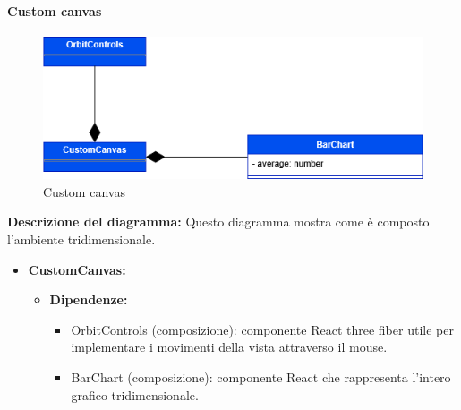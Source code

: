 \paragraph{Custom canvas}
\begin{figure}[h!] \centering
    \includegraphics[scale=0.45]{template/images/uml_front/ui/customcanvas.png}
    \caption{Custom canvas}
\end{figure}
\textbf{Descrizione del diagramma:}
Questo diagramma mostra come è composto l'ambiente tridimensionale.
\begin{itemize}
    \item \textbf{CustomCanvas:}
    \begin{itemize}
        \item \textbf{Dipendenze:}
        \begin{itemize}
            \item OrbitControls (composizione): componente React three fiber utile per implementare i movimenti della vista attraverso il mouse.
            \item BarChart (composizione): componente React che rappresenta l'intero grafico tridimensionale.
        \end{itemize} 
    \end{itemize}
\end{itemize}

\pagebreak

